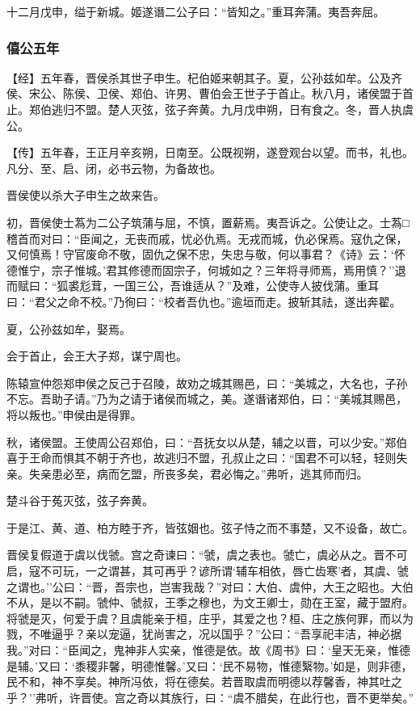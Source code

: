 \documentclass[]{article}
\begin{document}
十二月戊申，缢于新城。姬遂谮二公子曰：``皆知之。''重耳奔蒲。夷吾奔屈。

\hypertarget{header-n692}{%
\subsubsection{僖公五年}\label{header-n692}}

【经】五年春，晋侯杀其世子申生。杞伯姬来朝其子。夏，公孙兹如牟。公及齐侯、宋公、陈侯、卫侯、郑伯、许男、曹伯会王世子于首止。秋八月，诸侯盟于首止。郑伯逃归不盟。楚人灭弦，弦子奔黄。九月戊申朔，日有食之。冬，晋人执虞公。

【传】五年春，王正月辛亥朔，日南至。公既视朔，遂登观台以望。而书，礼也。凡分、至、启、闭，必书云物，为备故也。

晋侯使以杀大子申生之故来告。

初，晋侯使士蒍为二公子筑蒲与屈，不慎，置薪焉。夷吾诉之。公使让之。士蒍□稽首而对曰：``臣闻之，无丧而戚，忧必仇焉。无戎而城，仇必保焉。寇仇之保，又何慎焉！守官废命不敬，固仇之保不忠，失忠与敬，何以事君？《诗》云：`怀德惟宁，宗子惟城。'君其修德而固宗子，何城如之？三年将寻师焉，焉用慎？''退而赋曰：``狐裘尨茸，一国三公，吾谁适从？''及难，公使寺人披伐蒲。重耳曰：``君父之命不校。''乃徇曰：``校者吾仇也。''逾垣而走。披斩其祛，遂出奔翟。

夏，公孙兹如牟，娶焉。

会于首止，会王大子郑，谋宁周也。

陈辕宣仲怨郑申侯之反己于召陵，故劝之城其赐邑，曰：``美城之，大名也，子孙不忘。吾助子请。''乃为之请于诸侯而城之，美。遂谮诸郑伯，曰：``美城其赐邑，将以叛也。''申侯由是得罪。

秋，诸侯盟。王使周公召郑伯，曰：``吾抚女以从楚，辅之以晋，可以少安。''郑伯喜于王命而惧其不朝于齐也，故逃归不盟，孔叔止之曰：``国君不可以轻，轻则失亲。失亲患必至，病而乞盟，所丧多矣，君必悔之。''弗听，逃其师而归。

楚斗谷于菟灭弦，弦子奔黄。

于是江、黄、道、柏方睦于齐，皆弦姻也。弦子恃之而不事楚，又不设备，故亡。

晋侯复假道于虞以伐虢。宫之奇谏曰：``虢，虞之表也。虢亡，虞必从之。晋不可启，寇不可玩，一之谓甚，其可再乎？谚所谓`辅车相依，唇亡齿寒'者，其虞、虢之谓也。''公曰：``晋，吾宗也，岂害我哉？''对曰：大伯、虞仲，大王之昭也。大伯不从，是以不嗣。虢仲、虢叔，王季之穆也，为文王卿士，勋在王室，藏于盟府。将虢是灭，何爱于虞？且虞能亲于桓，庄乎，其爱之也？桓、庄之族何罪，而以为戮，不唯逼乎？亲以宠逼，犹尚害之，况以国乎？''公曰：``吾享祀丰洁，神必据我。''对曰：``臣闻之，鬼神非人实亲，惟德是依。故《周书》曰：`皇天无亲，惟德是辅。'又曰：`黍稷非馨，明德惟馨。'又曰：`民不易物，惟德繄物。'如是，则非德，民不和，神不享矣。神所冯依，将在德矣。若晋取虞而明德以荐馨香，神其吐之乎？''弗听，许晋使。宫之奇以其族行，曰：``虞不腊矣，在此行也，晋不更举矣。''
\end{document}
